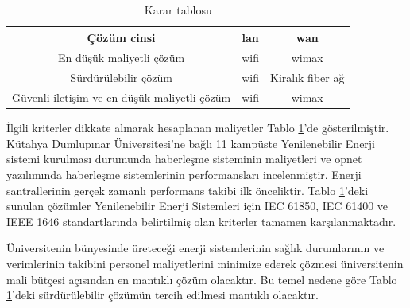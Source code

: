 \begin{table}[htbp]
\centering
\caption{Karar tablosu}
\label{tab:tablo5-1}
\begin{tabular}{|c|c|c|}
\hline
Çözüm cinsi                               & \gls{lan} & \gls{wan}        \\ \hline
En düşük maliyetli çözüm                     & \gls{wifi}           & \gls{wimax}                 \\ \hline
Sürdürülebilir çözüm                      & \gls{wifi}           & Kiralık fiber ağ \\ \hline
Güvenli iletişim ve en düşük maliyetli çözüm & \gls{wifi}           & \gls{wimax}                 \\ \hline
\end{tabular}

\end{table}


İlgili kriterler dikkate alınarak hesaplanan maliyetler  Tablo \ref{tab:tablo5-1}’de gösterilmiştir. Kütahya Dumlupınar Üniversitesi'ne bağlı 11 kampüste Yenilenebilir Enerji sistemi kurulması durumunda haberleşme sisteminin maliyetleri ve \gls{opnet} yazılımında haberleşme sistemlerinin performansları incelenmiştir. Enerji santrallerinin gerçek zamanlı performans takibi ilk önceliktir. Tablo \ref{tab:tablo5-1}'deki sunulan çözümler Yenilenebilir Enerji Sistemleri için IEC 61850, IEC 61400 ve IEEE 1646 standartlarında belirtilmiş olan kriterler tamamen karşılanmaktadır.


Üniversitenin bünyesinde üreteceği enerji sistemlerinin sağlık durumlarının ve verimlerinin takibini personel maliyetlerini minimize ederek çözmesi üniversitenin mali bütçesi açısından en mantıklı çözüm olacaktır. Bu temel nedene göre Tablo \ref{tab:tablo5-1}'deki sürdürülebilir çözümün tercih edilmesi mantıklı olacaktır.


